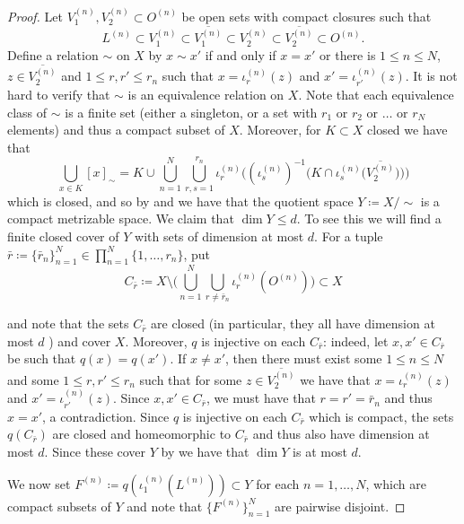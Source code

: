\documentclass[11pt,a4paper]{amsart}
\theoremstyle{definition}
\numberwithin{equation}{section}
\begin{document}
\begin{proof}
Let $V_1^{(n)}, V_2^{(n)}\subset O^{(n)}$ be open sets with compact closures such that 
\[
L^{(n)}\subset V_1^{(n)}\subset \overline{V_1^{(n)}}\subset V_2^{(n)}\subset\overline{V_2^{(n)}}\subset O^{(n)}.
\]
Define a relation $\sim$ on $X$ by $x\sim x'$ if and only if $x=x'$ or there is $1\le n\le N$, $z\in \overline{V_2^{(n)}}$ and $1\le r, r'\le r_n$ such that $x=\iota_r^{(n)}(z)$ and $x'=\iota_{r'}^{(n)}(z)$. It is not hard to verify that $\sim$ is an equivalence relation on $X$. Note that each equivalence class of $\sim$ is a finite set (either a singleton, or a set with $r_1$ or $r_2$ or $\dots$ or $r_N$ elements) and thus a compact subset of $X$. Moreover, for $K\subset X$ closed we have that
\begin{equation}
\bigcup_{x\in K}[x]_\sim = K\cup \bigcup_{n=1}^N\bigcup_{r,s=1}^{r_n}\iota_r^{(n)}\bigg((\iota_s^{(n)})^{-1}\big(K\cap \iota_s^{(n)}\big(\overline{V_2^{(n)}}\big)\big)\bigg)
\end{equation}
which is closed, and so by \cite[Proposition~2.4.9]{Engelking89} and \cite[Theorem~4.2.13]{Engelking89} we have that the quotient space $Y\coloneqq X/\sim$ is a compact metrizable space. We claim that $\dim Y\le d$. To see this we will find a finite closed cover of $Y$ with sets of dimension at most $d$. For a tuple $\bar{r}\coloneqq \{\bar{r}_n\}_{n=1}^N\in\prod_{n=1}^N\{1,\dots, r_n\}$, put 
\begin{equation}
C_{\bar{r}}\coloneqq X\setminus\bigg(\bigcup_{n=1}^N\bigcup_{r\ne \bar{r}_n}\iota_r^{(n)}(O^{(n)})\bigg) \subset X
\end{equation}

and note that the sets $C_{\bar{r}}$ are closed (in particular, they all have dimension at most $d$ \cite[Theorem~3.1.4]{Engelking78}) and cover $X$. Moreover, $q$ is injective on each $C_{\bar{r}}$: indeed, let $x,x'\in C_{\bar{r}}$ be such that $q(x)=q(x')$. If $x\ne x'$, then there must exist some $1\le n\le N$ and some $1\le r,r'\le r_n$ such that for some $z\in \overline{V_2^{(n)}}$ we have that $x=\iota_r^{(n)}(z)$ and $x'=\iota_{r'}^{(n)}(z)$. Since $x,x'\in C_{\bar{r}}$, we must have that $r=r'=\bar{r}_n$ and thus $x=x'$, a contradiction. Since $q$ is injective on each $C_{\bar{r}}$ which is compact, the sets $q(C_{\bar{r}})$ are closed and homeomorphic to $C_{\bar{r}}$ and thus also have dimension at most $d$. Since these cover $Y$ by \cite[Theorem~3.1.8]{Engelking78} we have that $\dim Y$ is at most $d$.

We now set $F^{(n)}\coloneqq q(\iota_1^{(n)}(L^{(n)}))\subset Y$ for each $n=1,\dots, N$, which are compact subsets of $Y$ and note that $\{F^{(n)}\}_{n=1}^N$ are pairwise disjoint. 


\end{proof}
\end{document}
